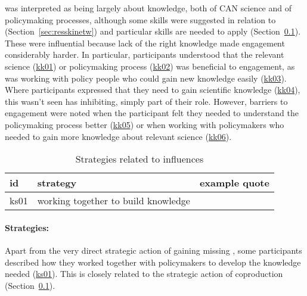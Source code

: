 \skiskil{} was interpreted as being largely about knowledge, both of CAN science and of policymaking processes, although some skills were suggested in relation to \skinetw{} (Section~\ref{sec:resskinetw}) and particular skills are needed to apply \skitech{} (Section~\ref{sec:resskitech}). These were influential because lack of the right knowledge made engagement considerably harder. In particular, participants understood that the relevant science (\hyperref[tab:resskiskil]{kk01}) or policymaking process (\hyperref[tab:resskiskil]{kk02}) was beneficial to engagement, as was working with policy people who could gain new knowledge easily (\hyperref[tab:resskiskil]{kk03}). Where participants expressed that they need to gain scientific knowledge (\hyperref[tab:resskiskil]{kk04}), this wasn't seen has inhibiting, simply part of their role. However, barriers to engagement were noted when the participant felt they needed to understand the policymaking process better (\hyperref[tab:resskiskil]{kk05}) or when working with policymakers who needed to gain more knowledge about relevant science (\hyperref[tab:resskiskil]{kk06}). 

\begin{table}[!ht]
\footnotesize
\caption{Strategies related to \skiskil{} influences}\label{tab:resskiskilstrat}
\begin{tabular}{L{.06\linewidth}L{.3\linewidth}L{.64\linewidth}} \hline
\textbf{id} & \textbf{strategy} & \textbf{example quote} \\ \hline \hline
ks01 & working together to build knowledge &  \\[5mm]
\hline
 \end{tabular}
\end{table}

\paragraph{Strategies:}
Apart from the very direct strategic action of gaining missing \skiskil, some participants described how they worked together with policymakers to develop the knowledge needed (\hyperref[tab:resskiskilstrat]{ks01}). This is closely related to the strategic action of coproduction (Section~\ref{sec:resskitech}).

\subsection{\tittech}\label{sec:resskitech}

